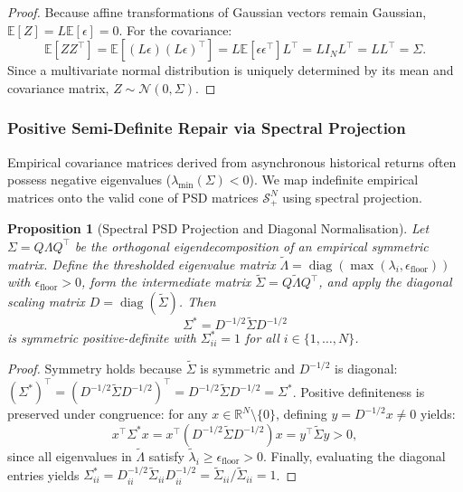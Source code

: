 \documentclass{article}
\theoremstyle{plain}
\newtheorem{proposition}[theorem]{Proposition}
\theoremstyle{definition}
\theoremstyle{remark}
\begin{document}
\begin{proof}
Because affine transformations of Gaussian vectors remain Gaussian, $\mathbb{E}[Z] = L\mathbb{E}[\epsilon] = 0$. For the covariance:
\begin{equation}
\mathbb{E}[ZZ^\top] = \mathbb{E}[(L\epsilon)(L\epsilon)^\top] = L\mathbb{E}[\epsilon\epsilon^\top]L^\top = L I_N L^\top = L L^\top = \Sigma.
\end{equation}
Since a multivariate normal distribution is uniquely determined by its mean and covariance matrix, $Z \sim \mathcal{N}(0, \Sigma)$.
\end{proof}

\subsubsection{Positive Semi-Definite Repair via Spectral Projection}
Empirical covariance matrices derived from asynchronous historical returns often possess negative eigenvalues ($\lambda_{\min}(\Sigma) < 0$). We map indefinite empirical matrices onto the valid cone of PSD matrices $\mathcal{S}_+^N$ using spectral projection.

\begin{proposition}[Spectral PSD Projection and Diagonal Normalisation]
Let $\Sigma = Q\Lambda Q^\top$ be the orthogonal eigendecomposition of an empirical symmetric matrix. Define the thresholded eigenvalue matrix $\tilde{\Lambda} = \operatorname{diag}(\max(\lambda_i, \epsilon_{\text{floor}}))$ with $\epsilon_{\text{floor}} > 0$, form the intermediate matrix $\tilde{\Sigma} = Q\tilde{\Lambda}Q^\top$, and apply the diagonal scaling matrix $D = \operatorname{diag}(\tilde{\Sigma})$. Then
\begin{equation}
\Sigma^* = D^{-1/2}\tilde{\Sigma}D^{-1/2}
\end{equation}
is symmetric positive-definite with $\Sigma_{ii}^* = 1$ for all $i \in \{1, \dots, N\}$.
\end{proposition}

\begin{proof}
Symmetry holds because $\tilde{\Sigma}$ is symmetric and $D^{-1/2}$ is diagonal: $(\Sigma^*)^\top = (D^{-1/2}\tilde{\Sigma}D^{-1/2})^\top = D^{-1/2}\tilde{\Sigma}D^{-1/2} = \Sigma^*$. Positive definiteness is preserved under congruence: for any $x \in \mathbb{R}^N \setminus \{0\}$, defining $y = D^{-1/2}x \ne 0$ yields:
\begin{equation}
x^\top \Sigma^* x = x^\top (D^{-1/2}\tilde{\Sigma}D^{-1/2})x = y^\top \tilde{\Sigma} y > 0,
\end{equation}
since all eigenvalues in $\tilde{\Lambda}$ satisfy $\tilde{\lambda}_i \ge \epsilon_{\text{floor}} > 0$. Finally, evaluating the diagonal entries yields $\Sigma_{ii}^* = D_{ii}^{-1/2}\tilde{\Sigma}_{ii}D_{ii}^{-1/2} = \tilde{\Sigma}_{ii}/\tilde{\Sigma}_{ii} = 1$.
\end{proof}
\end{document}
